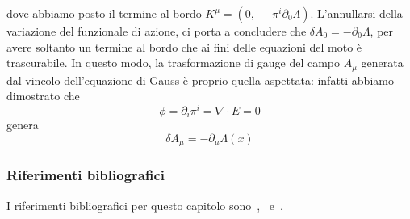     dove abbiamo posto il termine al bordo $K^\mu = (0, ~- \pi^i \partial_0 \Lambda)$. L'annullarsi della variazione del funzionale di azione, ci porta a concludere che $\delta A_0 = - \partial_0 \Lambda$, per avere soltanto un termine al bordo che ai fini delle equazioni del moto è trascurabile. In questo modo, la trasformazione di gauge del campo $A_\mu$ generata dal vincolo dell'equazione di Gauss è proprio quella aspettata: infatti abbiamo dimostrato che
\begin{equation*}
    \phi = \partial_i \pi^i = \nabla \cdot E = 0
\end{equation*}
    genera 
\begin{equation*}
    \delta A_\mu = - \partial_\mu \Lambda(x)
\end{equation*}

\subsubsection{Riferimenti bibliografici}
    I riferimenti bibliografici per questo capitolo sono~\cite{banados},~\cite{barone} e~\cite{weinberg}.
